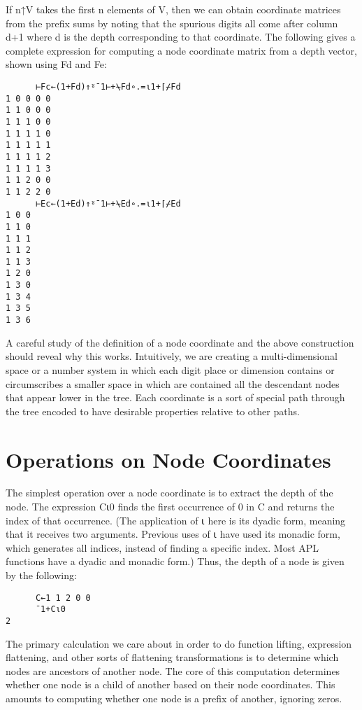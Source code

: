 \documentclass[pldi]{sigplanconf-pldi15}
\begin{document}
If n↑V takes the first n elements of V, then we can obtain coordinate matrices from the 
prefix sums by noting that the spurious digits all come after column d+1 where d is the 
depth corresponding to that coordinate. The following gives a complete expression for 
computing a node coordinate matrix from a depth vector, shown using Fd and Fe:

\begin{verbatim}
      ⊢Fc←(1+Fd)↑⍤¯1⊢+⍀Fd∘.=⍳1+⌈⌿Fd
1 0 0 0 0
1 1 0 0 0
1 1 1 0 0
1 1 1 1 0
1 1 1 1 1
1 1 1 1 2
1 1 1 1 3
1 1 2 0 0
1 1 2 2 0
      ⊢Ec←(1+Ed)↑⍤¯1⊢+⍀Ed∘.=⍳1+⌈⌿Ed
1 0 0
1 1 0
1 1 1
1 1 2
1 1 3
1 2 0
1 3 0
1 3 4
1 3 5
1 3 6
\end{verbatim}

A careful study of the definition of a node coordinate and the above construction should 
reveal why this works. Intuitively, we are creating a multi-dimensional space or a number 
system in which each digit place or dimension contains or circumscribes a smaller space in 
which are contained all the descendant nodes that appear lower in the tree. Each coordinate 
is a sort of special path through the tree encoded to have desirable properties relative to 
other paths.
\section{Operations on Node Coordinates}

The simplest operation over a node coordinate is to extract the depth of the node. The 
expression C⍳0 finds the first occurrence of 0 in C and returns the index of that 
occurrence. (The application of ⍳ here is its dyadic form, meaning that it receives two 
arguments. Previous uses of ⍳ have used its monadic form, which generates all indices, 
instead of finding a specific index. Most APL functions have a dyadic and monadic form.) 
Thus, the depth of a node is given by the following:

\begin{verbatim}
      C←1 1 2 0 0
      ¯1+C⍳0
2
\end{verbatim}

The primary calculation we care about in order to do function lifting, expression flattening, 
and other sorts of flattening transformations is to determine which nodes are ancestors of 
another node. The core of this computation determines whether one node is a child of another 
based on their node coordinates. This amounts to computing whether one node is a prefix of 
another, ignoring zeros.
\end{document}
